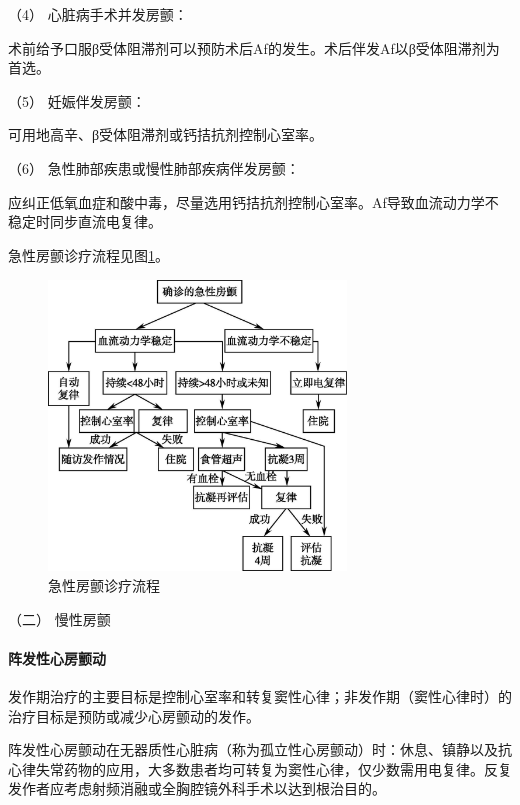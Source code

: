 \hypertarget{text00291.htmlux5cux23CHP10-2-4-3-1-1-3-4}{}
（4） 心脏病手术并发房颤：

术前给予口服β受体阻滞剂可以预防术后Af的发生。术后伴发Af以β受体阻滞剂为首选。

\hypertarget{text00291.htmlux5cux23CHP10-2-4-3-1-1-3-5}{}
（5） 妊娠伴发房颤：

可用地高辛、β受体阻滞剂或钙拮抗剂控制心室率。

\hypertarget{text00291.htmlux5cux23CHP10-2-4-3-1-1-3-6}{}
（6） 急性肺部疾患或慢性肺部疾病伴发房颤：

应纠正低氧血症和酸中毒，尽量选用钙拮抗剂控制心室率。Af导致血流动力学不稳定时同步直流电复律。

急性房颤诊疗流程见图\ref{fig102-8}。

\begin{figure}[!htbp]
 \centering
 \includegraphics[width=3.11458in,height=3.04167in]{./images/Image00432.jpg}
 \captionsetup{justification=centering}
 \caption{急性房颤诊疗流程}
 \label{fig102-8}
  \end{figure} 

\hypertarget{text00291.htmlux5cux23CHP10-2-4-3-1-2}{}
（二） 慢性房颤

\paragraph{阵发性心房颤动}

发作期治疗的主要目标是控制心室率和转复窦性心律；非发作期（窦性心律时）的治疗目标是预防或减少心房颤动的发作。

阵发性心房颤动在无器质性心脏病（称为孤立性心房颤动）时：休息、镇静以及抗心律失常药物的应用，大多数患者均可转复为窦性心律，仅少数需用电复律。反复发作者应考虑射频消融或全胸腔镜外科手术以达到根治目的。

